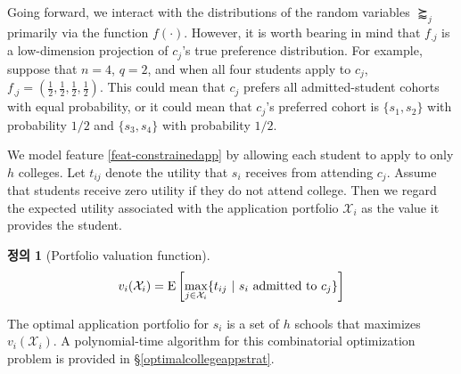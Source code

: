 \documentclass[12pt]{article} %
\theoremstyle{definition}
\newtheorem{definition}{Definition}
\newtheorem{assumption}{Assumption}
\theoremstyle{definition}
\newtheorem{definition}{정의}
\newtheorem{assumption}{가정}
\begin{document}
Going forward, we interact with the distributions of the random variables $\succapprox_j$ primarily via the function $f(\cdot)$. However, it is worth bearing in mind that $f_{.j}$ is a low-dimension projection of $c_j$'s true preference distribution. For example, suppose that $n=4$, $q=2$, and when all four students apply to $c_j$, $f_{.j} = (\tfrac{1}{2}, \tfrac{1}{2}, \tfrac{1}{2}, \tfrac{1}{2})$. This could mean that $c_j$ prefers all admitted-student cohorts with equal probability, or it could mean that $c_j$'s preferred cohort is $\{s_1, s_2\}$ with probability $1/2$ and $\{s_3, s_4\}$ with probability $1/2$. 

We model feature \ref{feat-constrainedapp} by allowing each student to apply to only $h$ colleges. Let $t_{ij}$ denote the utility that $s_i$ receives from attending $c_j$.  Assume that students receive zero utility if they do not attend college. Then we regard the expected utility associated with the application portfolio $\mathcal{X}_i$ as the value it provides the student.
\begin{definition}[Portfolio valuation function]
\begin{equation} \label{portfoliovaluationfn}%
v_i(\mathcal{X}_i) = \operatorname{E}\left[\max_{j \in \mathcal{X}_i }\{\text{$t_{ij}$~\textbar~$s_i$ admitted to $c_j$}\}\right]
\end{equation}
\end{definition}

The optimal application portfolio for $s_i$ is a set of $h$ schools that maximizes $v_i(\mathcal{X}_i)$. A polynomial-time algorithm for this combinatorial optimization problem is provided in \S\ref{optimalcollegeappstrat}.
\end{document}
